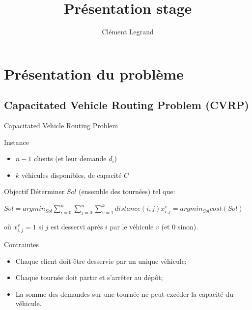 \documentclass{beamer}
\title{Présentation stage}
\author{Clément Legrand}
\begin{document}
\begin{frame}[plain]
\titlepage
\end{frame}

\section{Présentation du problème}

\subsection{Capacitated Vehicle Routing Problem (CVRP)}
\footnotesize
\begin{frame}{Capacitated Vehicle Routing Problem}
\begin{block}{Instance}
\begin{itemize}
\item $n-1$ clients (et leur demande $d_i$)
\item $k$ véhicules disponibles, de capacité $C$ 
\end{itemize}
\end{block}

\begin{exampleblock}{Objectif}
Déterminer $Sol$ (ensemble des tournées) tel que:

\centering
$ Sol = argmin_{Sol} \sum_{i = 0}^{n} \sum_{j = 0}^{n} \sum_{v = 1}^{k} distance(i,j) x_{i,j}^v = argmin_{Sol}cost(Sol)$

où $x_{i,j}^v = 1$ si $j$ est desservi après $i$ par le véhicule $v$ (et 0 sinon). 



\begin{alertblock}{Contraintes}
\begin{itemize}
\item Chaque client doit être desservie par un unique véhicule;
\item Chaque tournée doit partir et s'arrêter au dépôt;
\item La somme des demandes sur une tournée ne peut excéder la capacité du véhicule.
\end{itemize}
\end{alertblock}


\end{exampleblock}
\end{frame}
\end{document}
